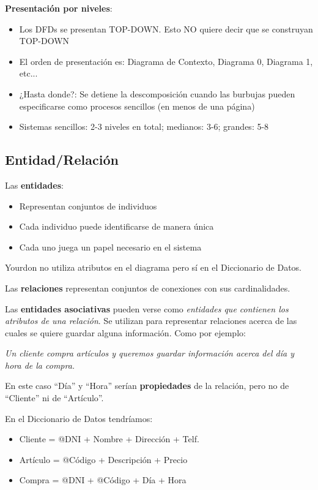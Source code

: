 \textbf{Presentación por niveles}:

\begin{itemize}[noitemsep]
\item Los DFDs se presentan TOP-DOWN. Esto NO quiere decir que se construyan TOP-DOWN
\item El orden de presentación es: Diagrama de Contexto, Diagrama 0, Diagrama 1, etc...
\item ¿Hasta donde?: Se detiene la descomposición cuando las burbujas pueden especificarse como procesos sencillos (en menos de una página)
\item Sistemas sencillos: 2-3 niveles en total; medianos: 3-6; grandes: 5-8
\end{itemize}


\subsection{Entidad/Relación}

Las \textbf{entidades}:

\begin{itemize}[noitemsep]
\item Representan conjuntos de individuos
\item Cada individuo puede identificarse de manera única
\item Cada uno juega un papel necesario en el sistema
\end{itemize}

Yourdon no utiliza atributos en el diagrama pero sí en el Diccionario de Datos.

Las \textbf{relaciones} representan conjuntos de conexiones con sus cardinalidades.

Las \textbf{entidades asociativas} pueden verse como \textit{entidades que contienen los atributos de una relación}. Se utilizan para representar relaciones acerca de las cuales se quiere guardar alguna información. Como por ejemplo:

\textit{Un cliente compra artículos y queremos guardar información acerca del día y hora de la compra.}

En este caso ``Día'' y ``Hora'' serían \textbf{propiedades} de la relación, pero no de ``Cliente'' ni de ``Artículo''.

En el Diccionario de Datos tendríamos:

\begin{itemize}[noitemsep]
\item Cliente = @DNI + Nombre + Dirección + Telf.
\item Artículo = @Código + Descripción + Precio
\item Compra = @DNI + @Código + Día + Hora
\end{itemize}

